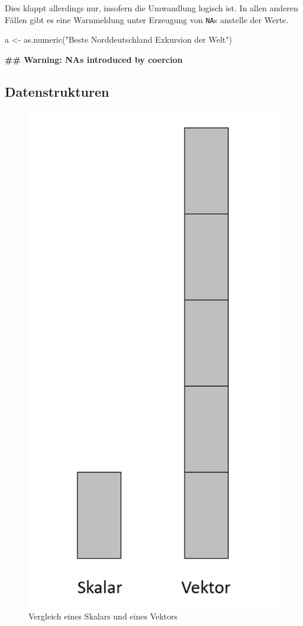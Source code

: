 \documentclass[
]{article}
\newenvironment{Shaded}{\begin{snugshade}}{\end{snugshade}}
\newcommand{\FunctionTok}[1]{\textcolor[rgb]{0.00,0.00,0.00}{#1}}
\newcommand{\NormalTok}[1]{#1}
\newcommand{\OtherTok}[1]{\textcolor[rgb]{0.56,0.35,0.01}{#1}}
\newcommand{\StringTok}[1]{\textcolor[rgb]{0.31,0.60,0.02}{#1}}
\begin{document}
Dies klappt allerdings nur, insofern die Umwandlung logisch ist. In allen anderen Fällen gibt es eine Warnmeldung unter Erzeugung von \texttt{NA}s anstelle der Werte.

\begin{Shaded}
\begin{Highlighting}[]
\NormalTok{a }\OtherTok{\textless{}{-}} \FunctionTok{as.numeric}\NormalTok{(}\StringTok{"Beste Norddeutschland Exkursion der Welt"}\NormalTok{)}
\end{Highlighting}
\end{Shaded}

\textbf{\#\# Warning: NAs introduced by coercion}

\hypertarget{datenstrukturen}{%
\subsection{Datenstrukturen}\label{datenstrukturen}}

\begin{figure}

{\centering \includegraphics[width=0.5\linewidth]{images/015} 

}

\caption{Vergleich eines Skalars und eines Vektors}\label{fig:unnamed-chunk-53}
\end{figure}
\end{document}
